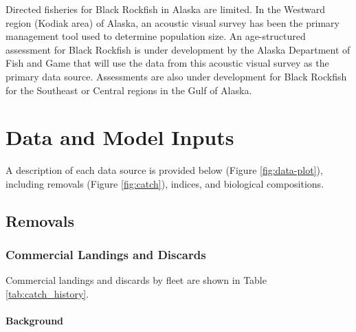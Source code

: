 \documentclass[11pt,
  english,
  letterpaper,
]{article}
\begin{document}
Directed fisheries for Black Rockfish in Alaska are limited. In the Westward region (Kodiak area) of Alaska, an acoustic visual survey has been the primary management tool used to determine population size. An age-structured assessment for Black Rockfish is under development by the Alaska Department of Fish and Game that will use the data from this acoustic visual survey as the primary data source. Assessments are also under development for Black Rockfish for the Southeast or Central regions in the Gulf of Alaska.

\hypertarget{data-and-model-inputs}{%
\section{Data and Model Inputs}\label{data-and-model-inputs}}

A description of each data source is provided below (Figure \ref{fig:data-plot}), including removals (Figure \ref{fig:catch}), indices, and biological compositions.

\hypertarget{removals-1}{%
\subsection{Removals}\label{removals-1}}

\hypertarget{commercial-landings-and-discards}{%
\subsubsection{Commercial Landings and Discards}\label{commercial-landings-and-discards}}

Commercial landings and discards by fleet are shown in Table \ref{tab:catch_history}.

\hypertarget{background}{%
\paragraph{Background}\label{background}}
\end{document}
